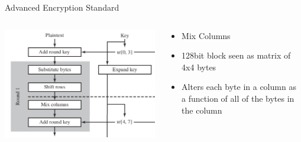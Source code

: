 \documentclass{beamer}
\begin{document}
\begin{frame}{Advanced Encryption Standard}
\begin{columns}[onlytextwidth]
    \begin{column}{0.6\textwidth}
  \begin{center}
    \includegraphics[width=1\linewidth]{AES-round}
  \end{center}
    \end{column}
    \begin{column}{0.4\textwidth}
  \begin{itemize}
  \item Mix Columns
  \item 128bit block seen as matrix of 4x4 bytes
  \item Alters each byte in a column as a function
    of all of the bytes in the column
  \end{itemize}
    \end{column}
    \end{columns}
\end{frame}
\end{document}
